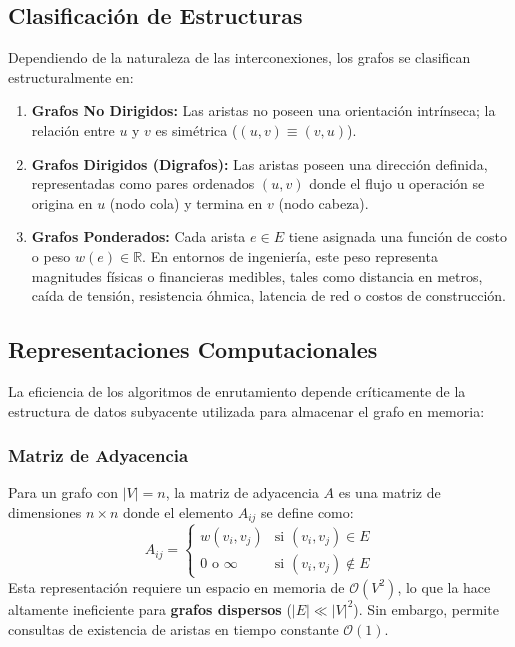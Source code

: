 \documentclass[11pt,letterpaper]{article}
\begin{document}
\subsection{Clasificación de Estructuras}
Dependiendo de la naturaleza de las interconexiones, los grafos se clasifican estructuralmente en:
\begin{enumerate}
    \item \textbf{Grafos No Dirigidos:} Las aristas no poseen una orientación intrínseca; la relación entre $u$ y $v$ es simétrica ($(u,v) \equiv (v,u)$).
    \item \textbf{Grafos Dirigidos (Digrafos):} Las aristas poseen una dirección definida, representadas como pares ordenados $(u, v)$ donde el flujo u operación se origina en $u$ (nodo cola) y termina en $v$ (nodo cabeza).
    \item \textbf{Grafos Ponderados:} Cada arista $e \in E$ tiene asignada una función de costo o peso $w(e) \in \mathbb{R}$. En entornos de ingeniería, este peso representa magnitudes físicas o financieras medibles, tales como distancia en metros, caída de tensión, resistencia óhmica, latencia de red o costos de construcción.
\end{enumerate}

\subsection{Representaciones Computacionales}
La eficiencia de los algoritmos de enrutamiento depende críticamente de la estructura de datos subyacente utilizada para almacenar el grafo en memoria:

\subsubsection{Matriz de Adyacencia}
Para un grafo con $|V| = n$, la matriz de adyacencia $A$ es una matriz de dimensiones $n \times n$ donde el elemento $A_{ij}$ se define como:
\begin{equation}
A_{ij} = \begin{cases} 
w(v_i, v_j) & \text{si } (v_i, v_j) \in E \\
0 \text{ o } \infty & \text{si } (v_i, v_j) \notin E 
\end{cases}
\end{equation}
Esta representación requiere un espacio en memoria de $\mathcal{O}(V^2)$, lo que la hace altamente ineficiente para \textbf{grafos dispersos} ($|E| \ll |V|^2$). Sin embargo, permite consultas de existencia de aristas en tiempo constante $\mathcal{O}(1)$.
\end{document}
